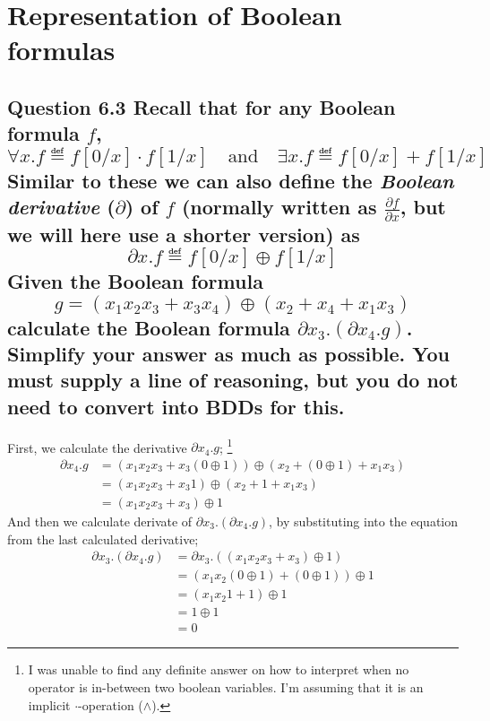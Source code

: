 \section{Representation of Boolean formulas}
\subsection*{Question 6.3 \mdseries Recall that for any Boolean formula $f$,
\[ \forall x.f \eqdef f[0/x] \cdot f[1/x]
\quad \text{and} \quad
\exists x.f \eqdef f[0/x] + f[1/x] \]
Similar to these we can also define the {\it Boolean derivative} ($\partial$)
of $f$ (normally written as $\frac{\partial f}{\partial x}$, but we will here
use a shorter version) as
\[ \partial x.f \eqdef f[0/x] \oplus f[1/x] \]
Given the Boolean formula
\[ g = (x_1 x_2 x_3 + x_3 x_4) \oplus (x_2 + x_4 + x_1 x_3) \]
calculate the Boolean formula $\partial x_3.(\partial x_4.g)$. Simplify your
answer as much as possible. You must supply a line of reasoning, but you do
not need to convert into BDDs for this.}

First, we calculate the derivative $\partial x_4.g$; \footnote{I was unable to
find any definite answer on how to interpret when no operator is in-between
two boolean variables. I'm assuming that it is an implicit $\cdot$-operation
($\land$).}
\begin{align*}
	\partial x_4.g &=
	(x_1 x_2 x_3 + x_3 (0 \oplus 1))
	\oplus
	(x_2 + (0 \oplus 1) + x_1 x_3) \\
	&=
	(x_1 x_2 x_3 + x_3 1)
	\oplus
	(x_2 + 1 + x_1 x_3) \\
	&=
	(x_1 x_2 x_3 + x_3)
	\oplus 1
\end{align*}
And then we calculate derivate of $\partial x_3.(\partial x_4.g)$, by
substituting into the equation from the last calculated derivative;
\begin{align*}
	\partial x_3.(\partial x_4.g)
	&= \partial x_3.( (x_1 x_2 x_3 + x_3) \oplus 1 ) \\
	&= (x_1 x_2 (0 \oplus 1) + (0 \oplus 1) ) \oplus 1 \\
	&= (x_1 x_2 1 + 1) \oplus 1 \\
	&= 1 \oplus 1 \\
	&= 0
\end{align*}
